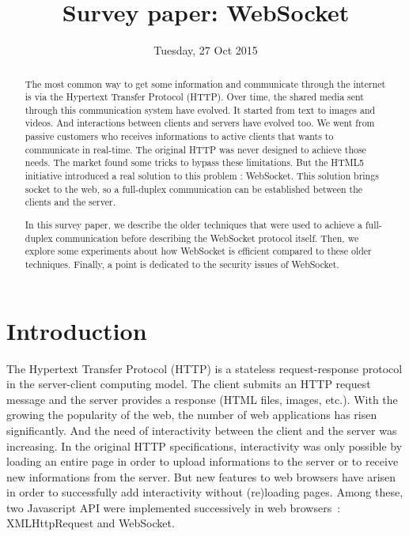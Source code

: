 \documentclass[journal,compsoc]{IEEEtran}
\newcommand{\ws}{WebSocket}
\begin{document}
\author{}

\title{Survey paper: \ws}

\date{Tuesday, 27 Oct 2015}

\maketitle
\IEEEpeerreviewmaketitle



\begin{abstract}
The most common way to get some information and communicate through the internet is via the Hypertext Transfer Protocol (HTTP).
Over time, the shared media sent through this communication system have evolved.
It started from text to images and videos.
And interactions between clients and servers have evolved too.
We went from passive customers who receives informations to active clients that wants to communicate in real-time.
The original HTTP was never designed to achieve those needs.
The market found some tricks to bypass these limitations.
But the HTML5 initiative introduced a real solution to this problem : \ws{}.
This solution brings socket to the web, so a full-duplex communication can be established between the clients and the server.

In this survey paper, we describe the older techniques that were used to achieve a full-duplex communication before describing the \ws{} protocol itself.
Then, we explore some experiments about how \ws{} is efficient compared to these older techniques.
Finally, a point is dedicated to the security issues of \ws.
\end{abstract}


\section{Introduction}

The Hypertext Transfer Protocol (HTTP) is a stateless request-response protocol in the server-client computing model.
The client submits an HTTP request message and the server provides a response (HTML files, images, etc.).
With the growing the popularity of the web, the number of web applications has risen significantly.
And the need of interactivity between the client and the server was increasing.
In the original HTTP specifications, interactivity was only possible by loading an entire page in order to upload informations to the server or to receive new informations from the server.
But new features to web browsers have arisen in order to successfully add interactivity without (re)loading pages.
Among these, two Javascript API were implemented successively in web \mbox{browsers :} XMLHttpRequest and \ws.
\end{document}
